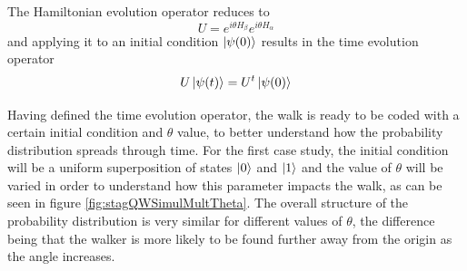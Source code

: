 \documentclass[../../dissertation.tex]{subfiles}
\begin{document}
The Hamiltonian evolution operator reduces to
\begin{equation}
	U = e^{i\theta H_\beta}e^{i\theta H_\alpha}
	\label{eq:stagSimulUniOp}
\end{equation}
and applying it to an initial condition $\ket{\psi(0)}$ results in the time
evolution operator
\begin{equation}
	U\ket{\psi(t)} = U^t\ket{\psi(0)}
\end{equation}\par

Having defined the time evolution operator, the walk is ready to be coded with
a certain initial condition and $\theta$ value, to better understand how the
probability distribution spreads through time. 
For the first case study, the initial condition will be a uniform superposition
of states $\ket{0}$ and $\ket{1}$ and the value of $\theta$ will be varied in
order to understand how this parameter impacts the walk, as can be seen in
figure \ref{fig:stagQWSimulMultTheta}. The overall structure of the probability
distribution is very similar for different values of $\theta$, the difference
being that the walker is more likely to be found further away from the origin
as the angle increases.
\end{document}
